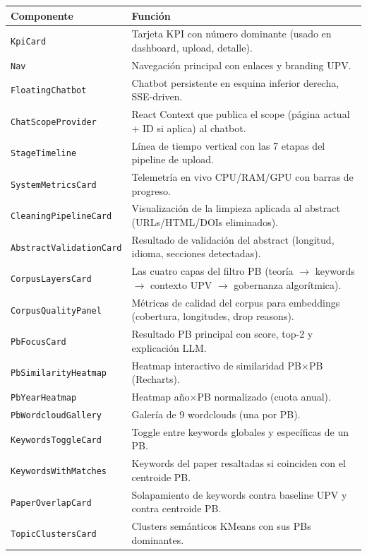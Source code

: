 \documentclass[11pt,a4paper]{article}
\newcommand{\modulo}[1]{\texttt{\textcolor{accent}{#1}}}
\begin{document}
\begin{table}[h]
\centering\small
\begin{tabularx}{\linewidth}{l X}
\toprule
\textbf{Componente} & \textbf{Función} \\
\midrule
\modulo{KpiCard} & Tarjeta KPI con número dominante (usado en dashboard, upload, detalle). \\
\modulo{Nav} & Navegación principal con enlaces y branding UPV. \\
\modulo{FloatingChatbot} & Chatbot persistente en esquina inferior derecha, SSE-driven. \\
\modulo{ChatScopeProvider} & React Context que publica el scope (página actual + ID si aplica) al chatbot. \\
\modulo{StageTimeline} & Línea de tiempo vertical con las 7 etapas del pipeline de upload. \\
\modulo{SystemMetricsCard} & Telemetría en vivo CPU/RAM/GPU con barras de progreso. \\
\modulo{CleaningPipelineCard} & Visualización de la limpieza aplicada al abstract (URLs/HTML/DOIs eliminados). \\
\modulo{AbstractValidationCard} & Resultado de validación del abstract (longitud, idioma, secciones detectadas). \\
\modulo{CorpusLayersCard} & Las cuatro capas del filtro PB (teoría $\to$ keywords $\to$ contexto UPV $\to$ gobernanza algorítmica). \\
\modulo{CorpusQualityPanel} & Métricas de calidad del corpus para embeddings (cobertura, longitudes, drop reasons). \\
\modulo{PbFocusCard} & Resultado PB principal con score, top-2 y explicación LLM. \\
\modulo{PbSimilarityHeatmap} & Heatmap interactivo de similaridad PB$\times$PB (Recharts). \\
\modulo{PbYearHeatmap} & Heatmap año$\times$PB normalizado (cuota anual). \\
\modulo{PbWordcloudGallery} & Galería de 9 wordclouds (una por PB). \\
\modulo{KeywordsToggleCard} & Toggle entre keywords globales y específicas de un PB. \\
\modulo{KeywordsWithMatches} & Keywords del paper resaltadas si coinciden con el centroide PB. \\
\modulo{PaperOverlapCard} & Solapamiento de keywords contra baseline UPV y contra centroide PB. \\
\modulo{TopicClustersCard} & Clusters semánticos KMeans con sus PBs dominantes. \\

\end{tabularx}
\end{table}
\end{document}
